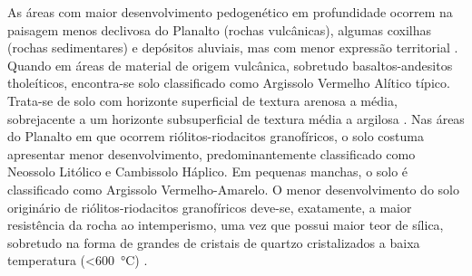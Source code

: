 
As áreas com maior desenvolvimento pedogenético em profundidade ocorrem na paisagem menos declivosa 
do Planalto (rochas vulcânicas), algumas coxilhas (rochas sedimentares) e depósitos aluviais, mas 
com menor expressão territorial \citep{Miguel2010}. Quando em áreas de material de origem vulcânica,
sobretudo basaltos-andesitos tholeíticos, encontra-se solo classificado como Argissolo Vermelho 
Alítico típico. Trata-se de solo com horizonte superficial de textura arenosa a média, sobrejacente 
a um horizonte subsuperficial de textura média a argilosa \citep{Miguel2010}. Nas áreas do Planalto 
em que ocorrem riólitos-riodacitos granofíricos, o solo costuma apresentar menor desenvolvimento, 
predominantemente classificado como Neossolo Litólico e Cambissolo Háplico. Em pequenas manchas, o 
solo é classificado como Argissolo Vermelho-Amarelo. O menor desenvolvimento do solo originário de 
riólitos-riodacitos granofíricos deve-se, exatamente, a maior resistência da rocha ao intemperismo, 
uma vez que possui maior teor de sílica, sobretudo na forma de grandes de cristais de quartzo 
cristalizados a baixa temperatura (\SI{<600}{\celsius}) \citep{Pedron2007}.

